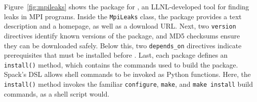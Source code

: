Figure~\ref{fig:mpileaks} shows the package for \mpileaks, an LLNL-developed
tool for finding leaks in MPI programs.
Inside the {\tt MpiLeaks} class, the package provides a text description
and a homepage, as well as 
a download URL.  Next, two {\tt version} directives identify known versions
of the package, and MD5 checksums ensure they can be downloaded safely.
Below this, two {\tt depends\_on}
directives indicate prerequisites that must be installed before \mpileaks.
Last, each package defines an {\tt install()} method, which contains the
commands used to build the package.  Spack's DSL allows shell
commands to be invoked as Python functions. Here, the {\tt install()} 
method invokes the familiar {\tt configure}, {\tt make}, and
{\tt make install} build commands, as a shell script would.





